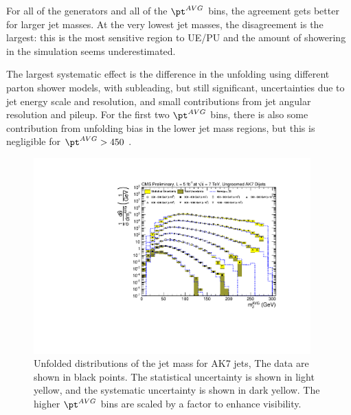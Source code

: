 For all of the generators and all of the $\pt^{AVG}$ bins, 
the agreement gets better for
larger jet masses. At the very lowest jet masses, the disagreement
is the largest: this is the most sensitive region to UE/PU and the amount of showering in the simulation seems underestimated. 

The largest systematic effect is the difference in the
unfolding using different parton shower models, with
subleading, but still significant, uncertainties due to
jet energy scale and resolution, and
small contributions from jet angular resolution and pileup. 
For the first two $\pt^{AVG}$ bins, there is also
some contribution from unfolding bias in the lower
jet mass regions, but this is negligible for
$\pt^{AVG} > 450$ \GeV. 


%


\begin{figure}[htbp]
\centering
\includegraphics[width=0.95\textwidth]{figs/unfoldedMeasurementDijets_all_}
\caption{Unfolded distributions of the jet mass for AK7 jets,
The data are shown in black points. 
The statistical uncertainty is shown in light yellow, and the
systematic uncertainty is shown in dark yellow.
The higher $\pt^{AVG}$ bins are scaled by a factor to
enhance visibility.
\label{figs:unfoldedMeasurementDijets_all}}
\end{figure}


